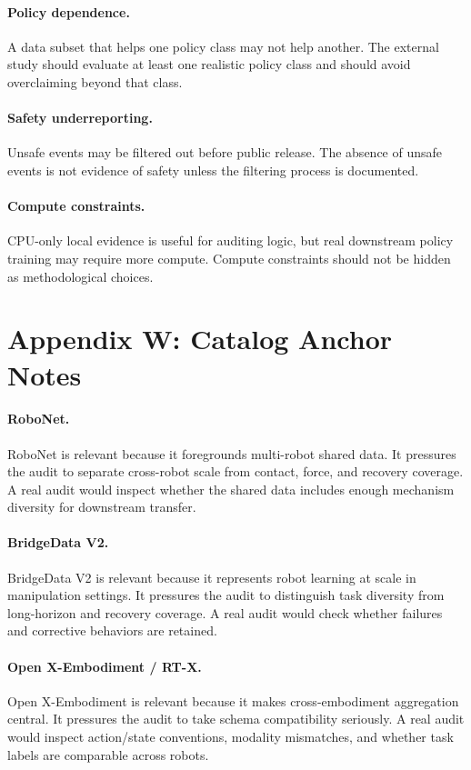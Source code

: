 \documentclass{article}
\begin{document}
\paragraph{Policy dependence.}
A data subset that helps one policy class may not help another. The external study should evaluate at least one realistic policy class and should avoid overclaiming beyond that class.

\paragraph{Safety underreporting.}
Unsafe events may be filtered out before public release. The absence of unsafe events is not evidence of safety unless the filtering process is documented.

\paragraph{Compute constraints.}
CPU-only local evidence is useful for auditing logic, but real downstream policy training may require more compute. Compute constraints should not be hidden as methodological choices.

\section{Appendix W: Catalog Anchor Notes}
\paragraph{RoboNet.}
RoboNet is relevant because it foregrounds multi-robot shared data. It pressures the audit to separate cross-robot scale from contact, force, and recovery coverage. A real audit would inspect whether the shared data includes enough mechanism diversity for downstream transfer.

\paragraph{BridgeData V2.}
BridgeData V2 is relevant because it represents robot learning at scale in manipulation settings. It pressures the audit to distinguish task diversity from long-horizon and recovery coverage. A real audit would check whether failures and corrective behaviors are retained.

\paragraph{Open X-Embodiment / RT-X.}
Open X-Embodiment is relevant because it makes cross-embodiment aggregation central. It pressures the audit to take schema compatibility seriously. A real audit would inspect action/state conventions, modality mismatches, and whether task labels are comparable across robots.
\end{document}
